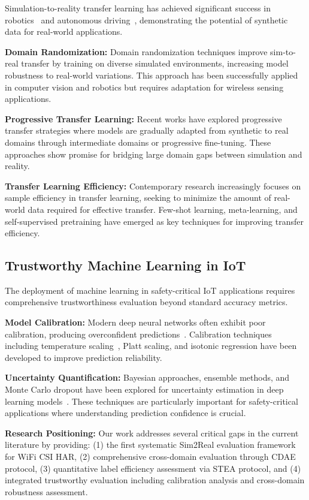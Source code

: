 \documentclass[journal]{IEEEtran}
\begin{document}
Simulation-to-reality transfer learning has achieved significant success in robotics~\cite{sim2real_robotics2017} and autonomous driving~\cite{sim2real_autonomous2019}, demonstrating the potential of synthetic data for real-world applications.

\textbf{Domain Randomization:} Domain randomization techniques improve sim-to-real transfer by training on diverse simulated environments, increasing model robustness to real-world variations. This approach has been successfully applied in computer vision and robotics but requires adaptation for wireless sensing applications.

\textbf{Progressive Transfer Learning:} Recent works have explored progressive transfer strategies where models are gradually adapted from synthetic to real domains through intermediate domains or progressive fine-tuning. These approaches show promise for bridging large domain gaps between simulation and reality.

\textbf{Transfer Learning Efficiency:} Contemporary research increasingly focuses on sample efficiency in transfer learning, seeking to minimize the amount of real-world data required for effective transfer. Few-shot learning, meta-learning, and self-supervised pretraining have emerged as key techniques for improving transfer efficiency.

\subsection{Trustworthy Machine Learning in IoT}

The deployment of machine learning in safety-critical IoT applications requires comprehensive trustworthiness evaluation beyond standard accuracy metrics.

\textbf{Model Calibration:} Modern deep neural networks often exhibit poor calibration, producing overconfident predictions~\cite{calibration_guo2017}. Calibration techniques including temperature scaling~\cite{temperature_scaling2017}, Platt scaling, and isotonic regression have been developed to improve prediction reliability.

\textbf{Uncertainty Quantification:} Bayesian approaches, ensemble methods, and Monte Carlo dropout have been explored for uncertainty estimation in deep learning models~\cite{reliability_assessment2019}. These techniques are particularly important for safety-critical applications where understanding prediction confidence is crucial.

\textbf{Research Positioning:} Our work addresses several critical gaps in the current literature by providing: (1) the first systematic Sim2Real evaluation framework for WiFi CSI HAR, (2) comprehensive cross-domain evaluation through CDAE protocol, (3) quantitative label efficiency assessment via STEA protocol, and (4) integrated trustworthy evaluation including calibration analysis and cross-domain robustness assessment.
\end{document}
